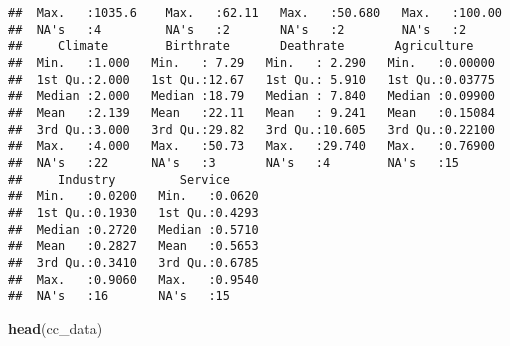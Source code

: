 \documentclass[]{article}
\newenvironment{Shaded}{\begin{snugshade}}{\end{snugshade}}
\newcommand{\KeywordTok}[1]{\textcolor[rgb]{0.13,0.29,0.53}{\textbf{#1}}}
\newcommand{\NormalTok}[1]{#1}
\begin{document}
\begin{verbatim}
##  Max.   :1035.6    Max.   :62.11   Max.   :50.680   Max.   :100.00  
##  NA's   :4         NA's   :2       NA's   :2        NA's   :2       
##     Climate        Birthrate       Deathrate       Agriculture     
##  Min.   :1.000   Min.   : 7.29   Min.   : 2.290   Min.   :0.00000  
##  1st Qu.:2.000   1st Qu.:12.67   1st Qu.: 5.910   1st Qu.:0.03775  
##  Median :2.000   Median :18.79   Median : 7.840   Median :0.09900  
##  Mean   :2.139   Mean   :22.11   Mean   : 9.241   Mean   :0.15084  
##  3rd Qu.:3.000   3rd Qu.:29.82   3rd Qu.:10.605   3rd Qu.:0.22100  
##  Max.   :4.000   Max.   :50.73   Max.   :29.740   Max.   :0.76900  
##  NA's   :22      NA's   :3       NA's   :4        NA's   :15       
##     Industry         Service      
##  Min.   :0.0200   Min.   :0.0620  
##  1st Qu.:0.1930   1st Qu.:0.4293  
##  Median :0.2720   Median :0.5710  
##  Mean   :0.2827   Mean   :0.5653  
##  3rd Qu.:0.3410   3rd Qu.:0.6785  
##  Max.   :0.9060   Max.   :0.9540  
##  NA's   :16       NA's   :15
\end{verbatim}

\begin{Shaded}
\begin{Highlighting}[]
\KeywordTok{head}\NormalTok{(cc_data)}
\end{Highlighting}
\end{Shaded}
\end{document}
